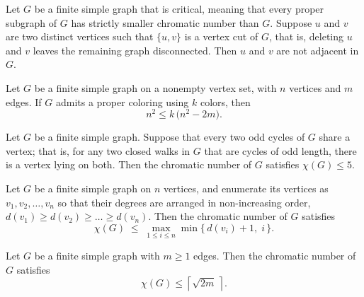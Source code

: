 \begin{theorem}
\label{SimpleGraph.IsCritical.not_adj_of_isVertexCut_pair}
\leanok
{}
Let $G$ be a finite simple graph that is critical, meaning that every proper subgraph of
$G$ has strictly smaller chromatic number than $G$. Suppose $u$ and $v$ are two distinct
vertices such that $\{u,v\}$ is a vertex cut of $G$, that is, deleting $u$ and $v$
leaves the remaining graph disconnected. Then $u$ and $v$ are not adjacent in $G$.
\end{theorem}

\begin{theorem}
\label{SimpleGraph.chromaticNumber_ge_of_card_edges}
\leanok
Let $G$ be a finite simple graph on a nonempty vertex set, with $n$ vertices and $m$
edges. If $G$ admits a proper coloring using $k$ colors, then
\[
n^2 \le k\,\bigl(n^2 - 2m\bigr).
\]
\end{theorem}

\begin{theorem}
\label{SimpleGraph.chromaticNumber_le_five_of_odd_cycles_meet}
\leanok
Let $G$ be a finite simple graph. Suppose that every two odd cycles of $G$ share a
vertex; that is, for any two closed walks in $G$ that are cycles of odd length, there is
a vertex lying on both. Then the chromatic number of $G$ satisfies $\chi(G) \le 5$.
\end{theorem}

\begin{theorem}
\label{SimpleGraph.welsh_powell}
\leanok
Let $G$ be a finite simple graph on $n$ vertices, and enumerate its vertices as $v_1,
v_2, \dots, v_n$ so that their degrees are arranged in non-increasing order, $d(v_1) \ge
d(v_2) \ge \dots \ge d(v_n)$. Then the chromatic number of $G$ satisfies
\[
\chi(G) \;\le\; \max_{1 \le i \le n} \min\bigl\{\, d(v_i) + 1,\; i \,\bigr\}.
\]
\end{theorem}

\begin{theorem}
\label{SimpleGraph.chromaticNumber_le_ceil_sqrt_two_mul_card_edges}
\leanok
Let $G$ be a finite simple graph with $m \geq 1$ edges. Then the chromatic number of $G$
satisfies
\[
\chi(G) \le \left\lceil \sqrt{2m} \,\right\rceil.
\]
\end{theorem}

